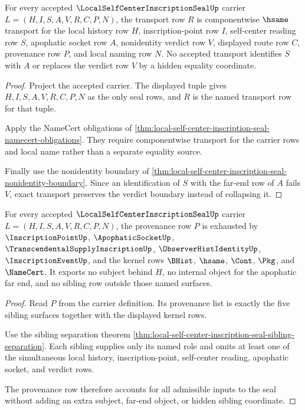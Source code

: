 \begin{theorem}
\label{thm:local-self-center-inscription-seal-transport-exactness}
For every accepted $\LocalSelfCenterInscriptionSealUp$ carrier $L=(H,I,S,A,V,R,C,P,N)$, the transport row $R$ is componentwise $\hsame$ transport for the local history row $H$, inscription-point row $I$, self-center reading row $S$, apophatic socket row $A$, nonidentity verdict row $V$, displayed route row $C$, provenance row $P$, and local naming row $N$. No accepted transport identifies $S$ with $A$ or replaces the verdict row $V$ by a hidden equality coordinate.
\end{theorem}
\begin{proof}
Project the accepted carrier. The displayed tuple gives $H,I,S,A,V,R,C,P,N$ as the only seal rows, and $R$ is the named transport row for that tuple.

Apply the NameCert obligations of \autoref{thm:local-self-center-inscription-seal-namecert-obligations}. They require componentwise transport for the carrier rows and local name rather than a separate equality source.

Finally use the nonidentity boundary of \autoref{thm:local-self-center-inscription-seal-nonidentity-boundary}. Since an identification of $S$ with the far-end row of $A$ fails $V$, exact transport preserves the verdict boundary instead of collapsing it.
\end{proof}

\begin{theorem}
\label{thm:local-self-center-inscription-seal-provenance-exhaustion}
For every accepted $\LocalSelfCenterInscriptionSealUp$ carrier $L=(H,I,S,A,V,R,C,P,N)$, the provenance row $P$ is exhausted by $\InscriptionPointUp$, $\ApophaticSocketUp$, $\TranscendentalSupplyInscriptionUp$, $\ObserverHistIdentityUp$, $\InscriptionEventUp$, and the kernel rows $\BHist$, $\hsame$, $\Cont$, $\Pkg$, and $\NameCert$. It exports no subject behind $H$, no internal object for the apophatic far end, and no sibling row outside those named surfaces.
\end{theorem}
\begin{proof}
Read $P$ from the carrier definition. Its provenance list is exactly the five sibling surfaces together with the displayed kernel rows.

Use the sibling separation theorem \autoref{thm:local-self-center-inscription-seal-sibling-separation}. Each sibling supplies only its named role and omits at least one of the simultaneous local history, inscription-point, self-center reading, apophatic socket, and verdict rows.

The provenance row therefore accounts for all admissible inputs to the seal without adding an extra subject, far-end object, or hidden sibling coordinate.
\end{proof}

